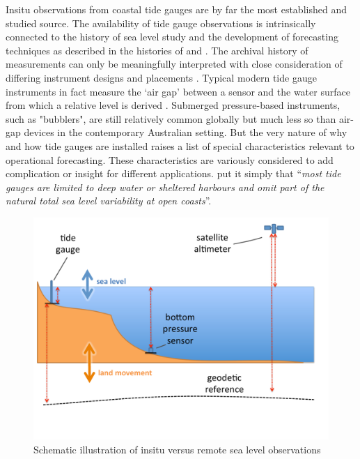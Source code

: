 Insitu observations from coastal tide gauges are by far the most established and studied source.    The availability of tide gauge observations is intrinsically connected to the history of sea level study and the development of forecasting techniques as described in the histories of \citet{Cartwright:2000tt} and \citet{reidy_tideshistory}.  The archival history of measurements can only be meaningfully interpreted with close consideration of differing instrument designs and placements \citep{talke2017_archive}.
Typical modern tide gauge instruments in fact measure the `air gap' between a sensor and the water surface from which a relative level is derived \citep{PCTMSL-sp9}.    Submerged pressure-based instruments, such as "bubblers", are still relatively common globally but much less so than air-gap devices in the contemporary Australian setting.
But the very nature of why and how tide gauges are installed raises a list of special characteristics relevant to operational forecasting. These characteristics are variously considered to add complication or insight for different applications. \citeauthor{10.1175/jtech-d-18-0203.1} put it simply that ``\textit{most tide gauges are limited to deep water or sheltered harbours and omit part of the natural total sea level variability at open coasts}''.   
\begin{figure}[!hbt]\centering
  \includegraphics[width=\figwidthBig]{figures/diagrams/sealevel_cartoon.pdf}
  \caption{Schematic illustration of insitu versus remote sea level observations}
  \label{fig:sealevelObsCartoon}
\end{figure}
